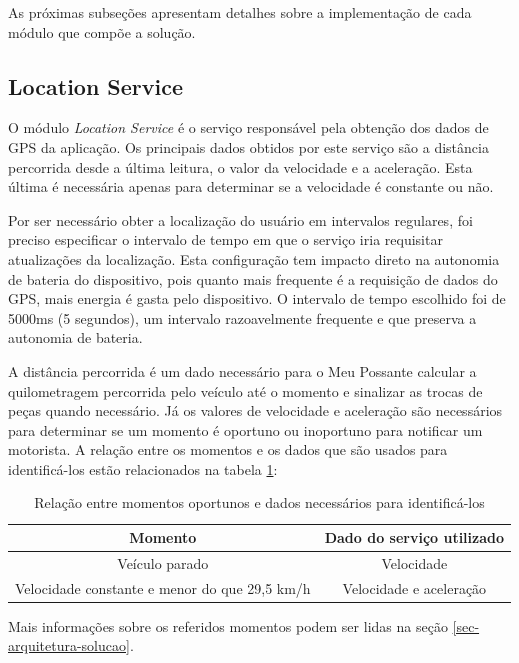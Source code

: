 As próximas subseções apresentam detalhes sobre a implementação de cada módulo que compõe a solução.

\subsection{Location Service}
\label{location-service}

O módulo \textit{Location Service} é o serviço responsável pela obtenção dos dados de GPS da aplicação. Os principais dados obtidos
por este serviço são a distância percorrida desde a última leitura, o valor da velocidade e a aceleração. Esta última é necessária
apenas para determinar se a velocidade é constante ou não.

Por ser necessário obter a localização do usuário em intervalos regulares, foi preciso especificar o intervalo de tempo em que o
serviço iria requisitar atualizações da localização. Esta configuração tem impacto direto na autonomia de bateria do dispositivo,
pois quanto mais frequente é a requisição de dados do GPS, mais energia é gasta pelo dispositivo. O intervalo de tempo escolhido
foi de 5000ms (5 segundos), um intervalo razoavelmente frequente e que preserva a autonomia de bateria.

A distância percorrida é um dado necessário para o Meu Possante calcular a quilometragem percorrida pelo veículo até o momento e
sinalizar as trocas de peças quando necessário. Já os valores de velocidade e aceleração são necessários para determinar se um
momento é oportuno ou inoportuno para notificar um motorista. A relação entre os momentos e os dados que são usados para
identificá-los estão relacionados na tabela \ref{tabela-momentos-dados}:

\begin{table}[h]
\centering
\caption{Relação entre momentos oportunos e dados necessários para identificá-los}
\label{tabela-momentos-dados}
\begin{tabular}{|c|c|}
\hline
\textbf{Momento}                              & \textbf{Dado do serviço utilizado} \\ \hline
Veículo parado                                & Velocidade                         \\ \hline
Velocidade constante e menor do que 29,5 km/h & Velocidade e aceleração            \\ \hline
\end{tabular}
\end{table}

Mais informações sobre os referidos momentos podem ser lidas na seção \ref{sec-arquitetura-solucao}.


